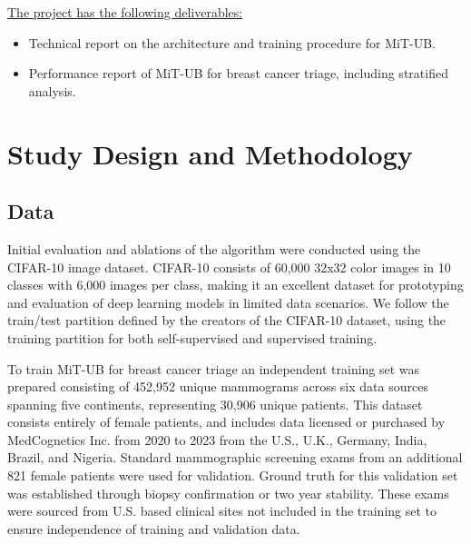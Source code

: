 \documentclass[12pt]{article}
\begin{document}
\underline{The project has the following deliverables:}
\begin{itemize}
    \item Technical report on the architecture and training procedure for MiT-UB.
    \item Performance report of MiT-UB for breast cancer triage, including stratified analysis.
\end{itemize}


\section{Study Design and Methodology}
\noindent

\subsection{Data}

Initial evaluation and ablations of the algorithm were conducted using the CIFAR-10 \cite{krizhevsky2009learning} image dataset. 
CIFAR-10 consists of 60,000 32x32 color images in 10 classes with 6,000 images per class, making it an excellent dataset for prototyping and evaluation of deep learning models
in limited data scenarios.
We follow the train/test partition defined by the creators of the CIFAR-10 dataset, using the training partition for both self-supervised and supervised training. \cite{krizhevsky2009learning}

To train MiT-UB for breast cancer triage an independent training set was prepared consisting of 452,952 unique mammograms across 
six data sources spanning five continents, representing 30,906 unique patients. This dataset consists entirely of female patients,
and includes data licensed or purchased by MedCognetics Inc. from 2020 to 2023 from the U.S., U.K., Germany, India, Brazil, and Nigeria. Standard mammographic screening exams from an additional 821 female patients were used for validation. Ground truth for this validation set
was established through biopsy confirmation or two year stability. 
These exams were sourced from U.S. based clinical sites not included in the training set to ensure independence of training and validation data.
\end{document}
